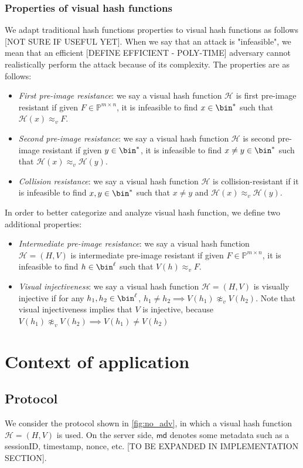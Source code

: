 \documentclass{article}
\newcommand{\bb}{\mathbb}
\newcommand{\vis}{\approx_v}
\newcommand{\pp}{\bb P}
\newcommand{\pmn}{\pp^{m \times n}}
\newcommand{\hh}{\mathcal H}
\begin{document}
\subsubsection{Properties of visual hash functions}
We adapt traditional hash functions properties to visual hash functions as follows [NOT SURE IF USEFUL YET]. When we say that an attack is "infeasible", we mean that an efficient [DEFINE EFFICIENT - POLY-TIME] adversary cannot realistically perform the attack because of its complexity. The properties are as follows:
\begin{itemize}
    \item \textit{First pre-image resistance}: we say a visual hash function $\mathcal H$ is first pre-image resistant if given $F \in \pmn$, it is infeasible to find $x \in \bin^*$ such that $\mathcal H(x) \vis F$.
    \item \textit{Second pre-image resistance}: we say a visual hash function $\mathcal H$ is second pre-image resistant if given $y \in \bin^*$, it is infeasible to find $x \neq y \in \bin ^*$ such that $\mathcal H(x) \vis \mathcal H(y)$.
    \item \textit{Collision resistance}: we say a visual hash function $\mathcal H$ is collision-resistant if it is infeasible to find $x, y \in \bin ^*$ such that $x \neq y$ and $\mathcal H(x) \vis \mathcal H(y)$.
\end{itemize}
In order to better categorize and analyze visual hash function, we define two additional properties:
\begin{itemize}
    \item \textit{Intermediate pre-image resistance}: we say a visual hash function $\mathcal H = (H, V)$ is intermediate pre-image resistant if given $F \in \pmn$, it is infeasible to find $h \in \bin^\ell$ such that $V(h) \vis F$.
    \item \textit{Visual injectiveness}: we say a visual hash function $\hh = (H,V)$ is visually injective if for any $h_1, h_2 \in \bin^\ell$, $h_1 \neq h_2 \implies V(h_1) \not\vis V(h_2)$. Note that visual injectiveness implies that $V$ is injective, because $V(h_1) \not\vis V(h_2) \implies V(h_1) \neq V(h_2)$
\end{itemize}
\section{Context of application}
\subsection{Protocol}
We consider the protocol shown in \cref{fig:no_adv}, in which a visual hash function $\hh = (H,V)$ is used. On the server side, $\mathsf{md}$ denotes some metadata such as a sessionID, timestamp, nonce, etc. [TO BE EXPANDED IN IMPLEMENTATION SECTION].
\end{document}
